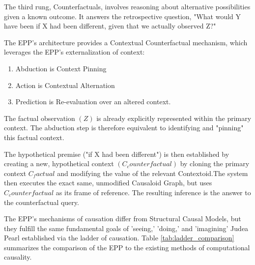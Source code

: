 The third rung, Counterfactuals, involves reasoning about alternative possibilities given a known outcome. It answers the retrospective question, "What would Y have been if X had been different, given that we actually observed Z?"

The EPP's architecture provides a Contextual Counterfactual mechanism, which leverages the EPP's externalization of context:

\begin{enumerate}
	\item Abduction is Context Pinning
	\item Action is Contextual Alternation
	\item Prediction is Re-evaluation over an altered context. 
\end{enumerate}

The factual observation $(Z)$ is already explicitly represented within the primary context. 
The abduction step is therefore equivalent to identifying and "pinning" this factual context.

The hypothetical premise ("if X had been different") is then established by creating a new, hypothetical context $(C_counterfactual)$ by cloning the primary context $C_factual$ and modifying the value of the relevant Contextoid.The system then executes the exact same, unmodified Causaloid Graph, but uses $C_counterfactual$ as its frame of reference. The resulting inference is the answer to the counterfactual query. 

\newpage

The EPP's mechanisms of causation differ from Structural Causal Models, 
but they fulfill the same fundamental goals of 'seeing,' 'doing,' and 'imagining' Judea Pearl established
via the ladder of causation. Table \ref{tab:ladder_comparison} summarizes the comparison of the EPP to the existing methods of computational causality.
 

